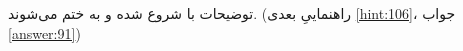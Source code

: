 \section{}
\paragraph{}\label{hint:338}
توضیحات با \lr{\texttt{/*}} شروع شده و به \lr{\texttt{*/}} ختم می‌شوند. (راهنماییِ بعدی \ref{hint:106}، جواب \ref{answer:91})